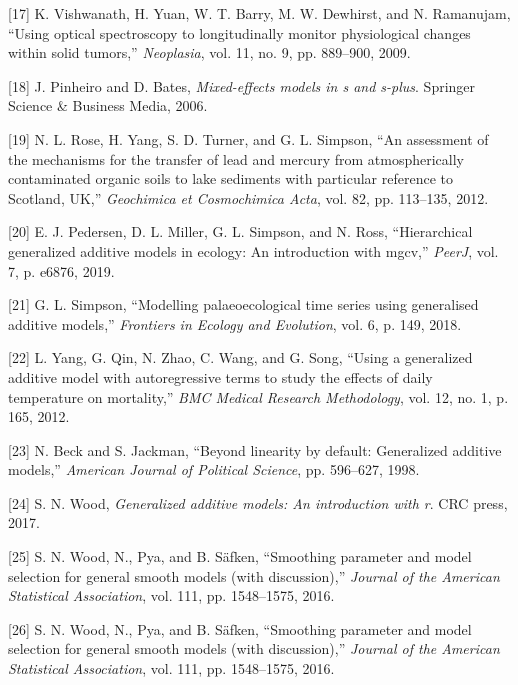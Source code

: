 \documentclass[
]{article}
\begin{document}
\leavevmode\hypertarget{ref-vishwanath2009}{}%
{[}17{]} K. Vishwanath, H. Yuan, W. T. Barry, M. W. Dewhirst, and N. Ramanujam, ``Using optical spectroscopy to longitudinally monitor physiological changes within solid tumors,'' \emph{Neoplasia}, vol. 11, no. 9, pp. 889--900, 2009.

\leavevmode\hypertarget{ref-pinheiro2006}{}%
{[}18{]} J. Pinheiro and D. Bates, \emph{Mixed-effects models in s and s-plus}. Springer Science \& Business Media, 2006.

\leavevmode\hypertarget{ref-rose2012}{}%
{[}19{]} N. L. Rose, H. Yang, S. D. Turner, and G. L. Simpson, ``An assessment of the mechanisms for the transfer of lead and mercury from atmospherically contaminated organic soils to lake sediments with particular reference to Scotland, UK,'' \emph{Geochimica et Cosmochimica Acta}, vol. 82, pp. 113--135, 2012.

\leavevmode\hypertarget{ref-pedersen2019}{}%
{[}20{]} E. J. Pedersen, D. L. Miller, G. L. Simpson, and N. Ross, ``Hierarchical generalized additive models in ecology: An introduction with mgcv,'' \emph{PeerJ}, vol. 7, p. e6876, 2019.

\leavevmode\hypertarget{ref-simpson2018}{}%
{[}21{]} G. L. Simpson, ``Modelling palaeoecological time series using generalised additive models,'' \emph{Frontiers in Ecology and Evolution}, vol. 6, p. 149, 2018.

\leavevmode\hypertarget{ref-yang2012}{}%
{[}22{]} L. Yang, G. Qin, N. Zhao, C. Wang, and G. Song, ``Using a generalized additive model with autoregressive terms to study the effects of daily temperature on mortality,'' \emph{BMC Medical Research Methodology}, vol. 12, no. 1, p. 165, 2012.

\leavevmode\hypertarget{ref-beck1998}{}%
{[}23{]} N. Beck and S. Jackman, ``Beyond linearity by default: Generalized additive models,'' \emph{American Journal of Political Science}, pp. 596--627, 1998.

\leavevmode\hypertarget{ref-wood2017}{}%
{[}24{]} S. N. Wood, \emph{Generalized additive models: An introduction with r}. CRC press, 2017.

\leavevmode\hypertarget{ref-wood2011}{}%
{[}25{]} S. N. Wood, N., Pya, and B. Säfken, ``Smoothing parameter and model selection for general smooth models (with discussion),'' \emph{Journal of the American Statistical Association}, vol. 111, pp. 1548--1575, 2016.

\leavevmode\hypertarget{ref-wood2016}{}%
{[}26{]} S. N. Wood, N., Pya, and B. Säfken, ``Smoothing parameter and model selection for general smooth models (with discussion),'' \emph{Journal of the American Statistical Association}, vol. 111, pp. 1548--1575, 2016.
\end{document}
